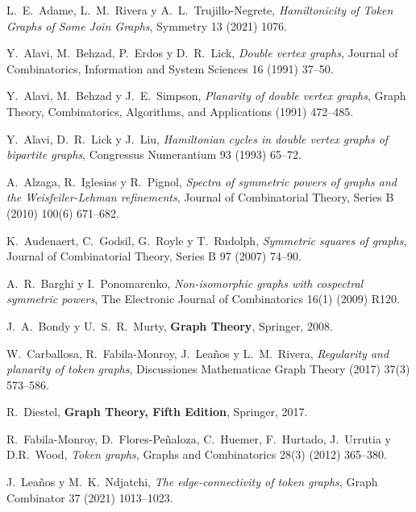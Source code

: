 \begin{thebibliography}{99}

  L.~E.~Adame, L.~M.~Rivera y A.~L.~Trujillo-Negrete,
  \textit{Hamiltonicity of Token Graphs of Some Join Graphs},
  Symmetry 13 (2021) 1076. 

  Y.~Alavi, M.~Behzad, P.~Erdos y D.~R.~Lick,
  \textit{Double vertex graphs},
  Journal of Combinatorics, Information and System Sciences 16 (1991) 37--50.

  Y.~Alavi, M.~Behzad y J.~E.~Simpson,
  \textit{Planarity of double vertex graphs},
  Graph Theory, Combinatorics, Algorithms, and Applications (1991) 472--485.

  Y.~Alavi, D.~R.~Lick y J.~Liu,
  \textit{Hamiltonian cycles in double vertex graphs of bipartite graphs},
  Congressus Numerantium 93 (1993) 65--72.

  A.~Alzaga, R.~Iglesias y  R.~Pignol,
  \textit{Spectra of symmetric powers of graphs and the Weisfeiler-Lehman
  refinements},
  Journal of Combinatorial Theory, Series B (2010) 100(6) 671--682. 

  K.~Audenaert, C.~Godsil, G.~Royle y T.~Rudolph,
  \textit{Symmetric squares of graphs},
  Journal of Combinatorial Theory, Series B 97 (2007) 74--90. 

  A.~R.~Barghi y I.~Ponomarenko,
  \textit{Non-isomorphic graphs with cospectral symmetric powers},
  The Electronic Journal of Combinatorics 16(1) (2009) R120.

  J.~A.~Bondy y U.~S.~R.~Murty,
  \textbf{Graph Theory},
  Springer, 2008.

  W.~Carballosa, R.~Fabila-Monroy, J.~Lea\~{n}os y L.~M.~Rivera,
  \textit{Regularity and planarity of token graphs},
  Discussiones Mathematicae Graph Theory (2017) 37(3) 573--586. 

  R.~Diestel,
  \textbf{Graph Theory, Fifth Edition},
  Springer, 2017.

  R.~Fabila-Monroy, D.~Flores-Pe\~{n}aloza, C.~Huemer, F.~Hurtado, J.~Urrutia y
  D.R.~Wood,
  \textit{Token graphs},
  Graphs and Combinatorics 28(3) (2012) 365--380. 
  
  J.~Lea\~{n}os y M.~K.~Ndjatchi,
  \textit{The edge-connectivity of token graphs},
  Graph Combinator 37 (2021) 1013--1023. 


\end{thebibliography}
